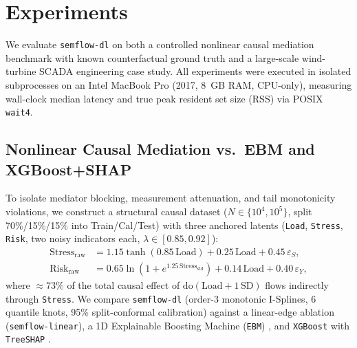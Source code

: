 \section{Experiments}
\label{sec:experiments}

We evaluate \texttt{semflow-dl} on both a controlled nonlinear causal mediation benchmark with known counterfactual ground truth and a large-scale wind-turbine SCADA engineering case study. All experiments were executed in isolated subprocesses on an Intel MacBook Pro (2017, 8~GB RAM, CPU-only), measuring wall-clock median latency and true peak resident set size (RSS) via POSIX \texttt{wait4}.

\subsection{Nonlinear Causal Mediation vs.\ EBM and XGBoost+SHAP}
To isolate mediator blocking, measurement attenuation, and tail monotonicity violations, we construct a structural causal dataset ($N \in \{10^4, 10^5\}$, split 70\%/15\%/15\% into Train/Cal/Test) with three anchored latents (\texttt{Load}, \texttt{Stress}, \texttt{Risk}, two noisy indicators each, $\lambda \in [0.85, 0.92]$):
\begin{align*}
  \mathrm{Stress}_{\mathrm{raw}} &= 1.15\tanh(0.85\,\mathrm{Load}) + 0.25\,\mathrm{Load} + 0.45\,\varepsilon_S, \\
  \mathrm{Risk}_{\mathrm{raw}}   &= 0.65\ln(1 + e^{1.25\,\mathrm{Stress}_{\mathrm{std}}}) + 0.14\,\mathrm{Load} + 0.40\,\varepsilon_Y,
\end{align*}
where $\approx 73\%$ of the total causal effect of $\mathrm{do}(\mathrm{Load} + 1\,\mathrm{SD})$ flows indirectly through \texttt{Stress}. We compare \texttt{semflow-dl} (order-3 monotonic I-Splines, 6 quantile knots, 95\% split-conformal calibration) against a linear-edge ablation (\texttt{semflow-linear}), a 1D Explainable Boosting Machine (\texttt{EBM}) \citep{lou2013accurate}, and \texttt{XGBoost} \citep{chen2016xgboost} with \texttt{TreeSHAP} \citep{lundberg2017unified}.

